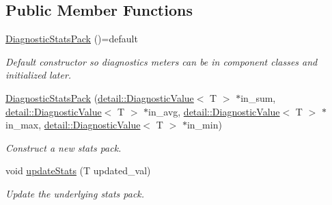 \subsection*{Public Member Functions}
\begin{DoxyCompactItemize}
\item 
\hyperlink{structvt_1_1runtime_1_1component_1_1meter_1_1_diagnostic_stats_pack_a1ff8f169f544a2c1966e9336043f97cb}{Diagnostic\+Stats\+Pack} ()=default
\begin{DoxyCompactList}\small\item\em Default constructor so diagnostics meters can be in component classes and initialized later. \end{DoxyCompactList}\item 
\hyperlink{structvt_1_1runtime_1_1component_1_1meter_1_1_diagnostic_stats_pack_a849682d9001fa90617a6a505b0cf3f17}{Diagnostic\+Stats\+Pack} (\hyperlink{structvt_1_1runtime_1_1component_1_1detail_1_1_diagnostic_value}{detail\+::\+Diagnostic\+Value}$<$ T $>$ $\ast$in\+\_\+sum, \hyperlink{structvt_1_1runtime_1_1component_1_1detail_1_1_diagnostic_value}{detail\+::\+Diagnostic\+Value}$<$ T $>$ $\ast$in\+\_\+avg, \hyperlink{structvt_1_1runtime_1_1component_1_1detail_1_1_diagnostic_value}{detail\+::\+Diagnostic\+Value}$<$ T $>$ $\ast$in\+\_\+max, \hyperlink{structvt_1_1runtime_1_1component_1_1detail_1_1_diagnostic_value}{detail\+::\+Diagnostic\+Value}$<$ T $>$ $\ast$in\+\_\+min)
\begin{DoxyCompactList}\small\item\em Construct a new stats pack. \end{DoxyCompactList}\item 
void \hyperlink{structvt_1_1runtime_1_1component_1_1meter_1_1_diagnostic_stats_pack_a76c69a042e32f540707de15227fd77d8}{update\+Stats} (T updated\+\_\+val)
\begin{DoxyCompactList}\small\item\em Update the underlying stats pack. \end{DoxyCompactList}\end{DoxyCompactItemize}
